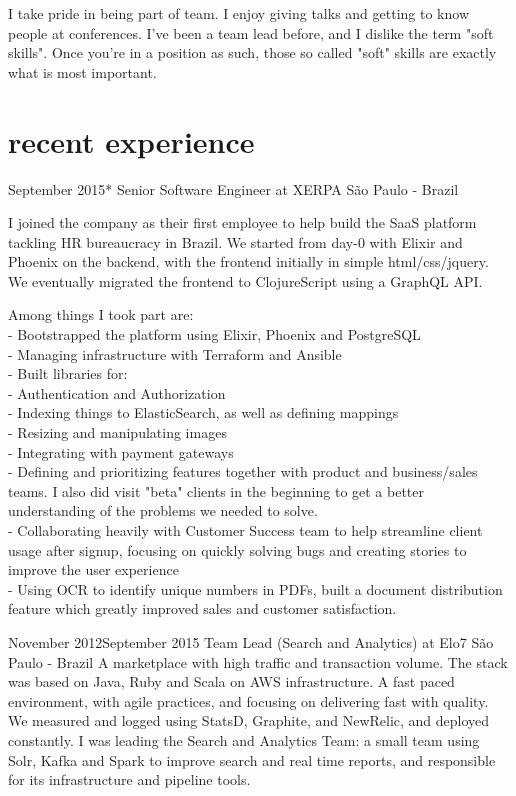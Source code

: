 \documentclass{nirev-cv}
\begin{document}
I take pride in being part of team. I enjoy giving talks and getting to know people at conferences.
I've been a team lead before, and I dislike the term "soft skills". Once you're in a position as such, those so called "soft" skills are exactly what is most important. 

\section{recent experience}
\workentry
    {September 2015}{*}
    {Senior Software Engineer at XERPA}
    {São Paulo - Brazil}
    {I joined the company as their first employee to help build the SaaS platform tackling HR bureaucracy in Brazil.
    We started from day-0 with Elixir and Phoenix on the backend, with the frontend initially in simple html/css/jquery. We eventually migrated the frontend to ClojureScript using a GraphQL API.
    
    Among things I took part are: \\ \small
    - Bootstrapped the platform using Elixir, Phoenix and PostgreSQL \\
    - Managing infrastructure with Terraform and Ansible \\
    - Built libraries for: \\
    - Authentication and Authorization \\
    - Indexing things to ElasticSearch, as well as defining mappings \\
    - Resizing and manipulating images \\
    - Integrating with payment gateways \\
    - Defining and prioritizing features together with product and business/sales teams. I also did visit "beta" clients in the beginning to get a better understanding of the problems we needed to solve. \\
    - Collaborating heavily with Customer Success team to help streamline client usage after signup, focusing on quickly solving bugs and creating stories to improve the user experience \\
    - Using OCR to identify unique numbers in PDFs, built a document distribution feature which greatly improved sales and customer satisfaction.} 

\workentry
  {November 2012}{September 2015}
  {Team Lead (Search and Analytics) at Elo7}
  {São Paulo - Brazil}
  {A marketplace with high traffic and transaction volume. The stack was based on Java, Ruby and Scala on AWS infrastructure. A fast paced environment, with agile practices, and focusing on delivering fast with quality. We measured and logged using StatsD, Graphite, and NewRelic, and deployed constantly. I was leading the Search and Analytics Team: a small team using Solr, Kafka and Spark to improve search and real time reports, and responsible for its infrastructure and pipeline tools.}
\end{document}
